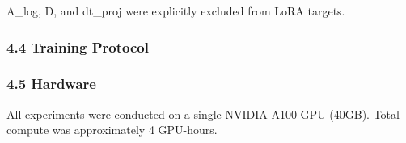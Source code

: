 A\_log, D, and dt\_proj were explicitly excluded from LoRA targets.

\subsubsection{4.4 Training Protocol}

\begin{table}[htbp]
\centering
{}
\end{table}

\subsubsection{4.5 Hardware}

All experiments were conducted on a single NVIDIA A100 GPU (40GB). Total compute was approximately 4 GPU-hours.
